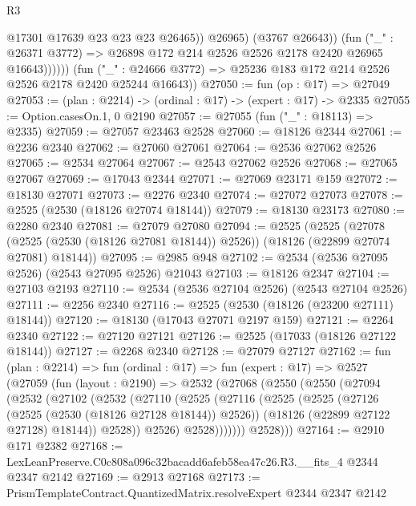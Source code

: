 \begin{lexlean}{R3}
\begin{coremodule}
                        @17301
                        @17639
                        @23
                        @23
                        @23
                        @26465))
                    @26965)
                  (@3767 @26643))
                (fun ("_" : @26371 @3772) =>
                @26898 @172 @214 @2526 @2526 @2178 @2420 @26965 @16643))))))
      (fun ("_" : @24666 @3772) => @25236 @183 @172 @214 @2526 @2526 @2178 @2420 @25244 @16643))
@27050 := fun (op : @17) => @27049
@27053 := (plan : @2214) -> (ordinal : @17) -> (expert : @17) -> @2335
@27055 := Option.casesOn.{1, 0} @2190
@27057 := @27055 (fun ("_" : @18113) => @2335)
@27059 := @27057 @23463 @2528
@27060 := @18126 @2344
@27061 := @2236 @2340
@27062 := @27060 @27061
@27064 := @2536 @27062 @2526
@27065 := @2534 @27064
@27067 := @2543 @27062 @2526
@27068 := @27065 @27067
@27069 := @17043 @2344
@27071 := @27069 @23171 @159
@27072 := @18130 @27071
@27073 := @2276 @2340
@27074 := @27072 @27073
@27078 := @2525 (@2530 (@18126 @27074 @18144))
@27079 := @18130 @23173
@27080 := @2280 @2340
@27081 := @27079 @27080
@27094 := @2525
    (@2525
      (@27078 (@2525 (@2530 (@18126 @27081 @18144)) @2526))
      (@18126 (@22899 @27074 @27081) @18144))
@27095 := @2985 @948
@27102 := @2534 (@2536 @27095 @2526) (@2543 @27095 @2526) @21043
@27103 := @18126 @2347
@27104 := @27103 @2193
@27110 := @2534 (@2536 @27104 @2526) (@2543 @27104 @2526)
@27111 := @2256 @2340
@27116 := @2525 (@2530 (@18126 (@23200 @27111) @18144))
@27120 := @18130 (@17043 @27071 @2197 @159)
@27121 := @2264 @2340
@27122 := @27120 @27121
@27126 := @2525 (@17033 (@18126 @27122 @18144))
@27127 := @2268 @2340
@27128 := @27079 @27127
@27162 := fun (plan : @2214) =>
  fun (ordinal : @17) =>
  fun (expert : @17) =>
  @2527
    (@27059
      (fun (layout : @2190) =>
      @2532
        (@27068
          (@2550
            (@2550
              (@27094
                (@2532
                  (@27102
                    (@2532
                      (@27110
                        (@2525
                          (@27116
                            (@2525
                              (@2525
                                (@27126 (@2525 (@2530 (@18126 @27128 @18144)) @2526))
                                (@18126 (@22899 @27122 @27128) @18144))
                              @2528))
                          @2526)
                        @2528)))))))
          @2528)))
@27164 := @2910 @171 @2382
@27168 := LexLeanPreserve.C0c808a096c32bacadd6afeb58ea47c26.R3.__fits_4 @2344 @2347 @2142
@27169 := @2913 @27168
@27173 := PrismTemplateContract.QuantizedMatrix.resolveExpert @2344 @2347 @2142

\end{coremodule}
\end{lexlean}
